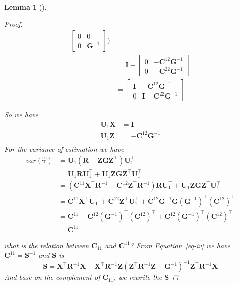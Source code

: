 \documentclass[
  a4paper,
  oneside,
  openany,
  12pt,
  onecolumn]{book}
\theoremstyle{definition}
\theoremstyle{definition}
\theoremstyle{plain}
\newtheorem{lemma}{Lemma}[chapter]
\theoremstyle{remark}
\begin{document}
\begin{lemma}[]
\begin{proof}
\[\begin{aligned}
\begin{bmatrix}
0 & 0 \\
0 & \boldsymbol{G}^{-1}
\end{bmatrix})\\
&=
\boldsymbol{I}-
\begin{bmatrix}
0 & -\boldsymbol{C}^{12}\boldsymbol{G}^{-1} \\
0 & -\boldsymbol{C}^{22}\boldsymbol{G}^{-1}
\end{bmatrix}\\
&=
\begin{bmatrix}
\boldsymbol{I} & -\boldsymbol{C}^{12}\boldsymbol{G}^{-1} \\
0 & \boldsymbol{I}-\boldsymbol{C}^{22}\boldsymbol{G}^{-1}
\end{bmatrix}
\end{aligned}\]

So we have \[\begin{aligned}
\boldsymbol{U}_1\boldsymbol{X}&=\boldsymbol{I}\\
\boldsymbol{U}_1\boldsymbol{Z}&=-\boldsymbol{C}^{12}\boldsymbol{G}^{-1}\\
\end{aligned}\] For the variance of estimation we have \[\begin{aligned}
var(\hat{\boldsymbol{\tau}})
&=
\boldsymbol{U}_1(\boldsymbol{R}+\boldsymbol{ZGZ}^\top)\boldsymbol{U}_1^\top\\
&= \boldsymbol{U}_1\boldsymbol{R}\boldsymbol{U}_1^\top+\boldsymbol{U}_1\boldsymbol{ZGZ}^\top\boldsymbol{U}_1^\top\\
&= (\boldsymbol{C}^{11}\boldsymbol{X}^\top\boldsymbol{R}^{-1}+\boldsymbol{C}^{12}\boldsymbol{Z}^\top\boldsymbol{R}^{-1})\boldsymbol{R}\boldsymbol{U}_1^\top+\boldsymbol{U}_1\boldsymbol{ZGZ}^\top\boldsymbol{U}_1^\top\\
&=\boldsymbol{C}^{11}\boldsymbol{X}^\top\boldsymbol{U}_1^\top+\boldsymbol{C}^{12}\boldsymbol{Z}^\top\boldsymbol{U}_1^\top+\boldsymbol{C}^{12}\boldsymbol{G}^{-1}\boldsymbol{G}(\boldsymbol{G}^{-1})^\top(\boldsymbol{C}^{12})^\top\\
&=\boldsymbol{C}^{11}-\boldsymbol{C}^{12}(\boldsymbol{G}^{-1})^\top(\boldsymbol{C}^{12})^\top+\boldsymbol{C}^{12}(\boldsymbol{G}^{-1})^\top(\boldsymbol{C}^{12})^\top\\
&=\boldsymbol{C}^{11}
\end{aligned}\]

what is the relation between \(\boldsymbol{C}_{11}\) and
\(\boldsymbol{C}^{11}\)? From Equation~\ref{eq-iv} we have
\(\boldsymbol{C}^{11}=\boldsymbol{S}^{-1}\) and \(\boldsymbol{S}\) is \[
\boldsymbol{S} = \boldsymbol{X}^\top \boldsymbol{R}^{-1} \boldsymbol{X} - \boldsymbol{X}^\top \boldsymbol{R}^{-1} \boldsymbol{Z} (\boldsymbol{Z}^\top \boldsymbol{R}^{-1} \boldsymbol{Z} + \boldsymbol{G}^{-1})^{-1} \boldsymbol{Z}^\top \boldsymbol{R}^{-1} \boldsymbol{X}
\] And base on the complement of \(\boldsymbol{C}_{11}\), we rewrite the
\(\boldsymbol{S}\)


\end{proof}
\end{lemma}
\end{document}
